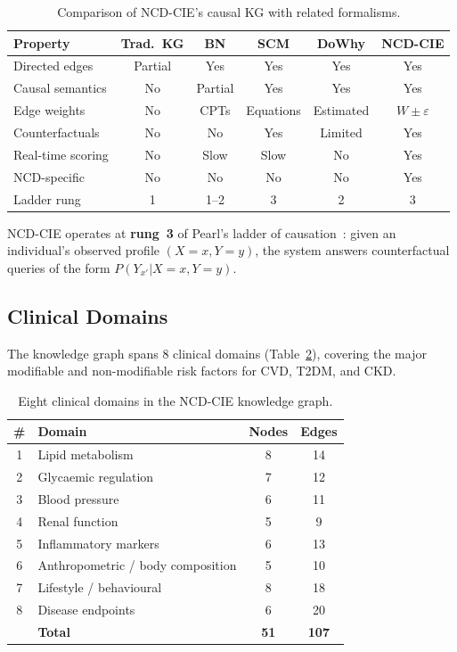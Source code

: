\documentclass[runningheads]{llncs}
\begin{document}
\begin{table}[t]
\centering
\caption{Comparison of NCD-CIE's causal KG with related formalisms.}
\label{tab:comparison}
\small
\begin{tabular}{@{}lccccc@{}}
\toprule
\textbf{Property} & \textbf{Trad.\ KG} & \textbf{BN} & \textbf{SCM} & \textbf{DoWhy} & \textbf{NCD-CIE} \\
\midrule
Directed edges       & Partial & Yes & Yes & Yes & Yes \\
Causal semantics     & No      & Partial & Yes & Yes & Yes \\
Edge weights         & No      & CPTs & Equations & Estimated & $W \pm \varepsilon$ \\
Counterfactuals      & No      & No  & Yes & Limited & Yes \\
Real-time scoring    & No      & Slow & Slow & No & Yes \\
NCD-specific         & No      & No  & No  & No & Yes \\
Ladder rung          & 1       & 1--2 & 3   & 2  & 3 \\
\bottomrule
\end{tabular}
\end{table}

NCD-CIE operates at \textbf{rung~3} of Pearl's ladder of
causation~\cite{pearl2018book}: given an individual's observed profile
$(X=x, Y=y)$, the system answers counterfactual queries of the form
$P(Y_{x'}|X=x, Y=y)$.

\subsection{Clinical Domains}

The knowledge graph spans 8 clinical domains (Table~\ref{tab:domains}),
covering the major modifiable and non-modifiable risk factors for CVD,
T2DM, and CKD.

\begin{table}[t]
\centering
\caption{Eight clinical domains in the NCD-CIE knowledge graph.}
\label{tab:domains}
\small
\begin{tabular}{@{}clcc@{}}
\toprule
\textbf{\#} & \textbf{Domain} & \textbf{Nodes} & \textbf{Edges} \\
\midrule
1 & Lipid metabolism        & 8  & 14 \\
2 & Glycaemic regulation    & 7  & 12 \\
3 & Blood pressure          & 6  & 11 \\
4 & Renal function          & 5  & 9  \\
5 & Inflammatory markers    & 6  & 13 \\
6 & Anthropometric / body composition & 5 & 10 \\
7 & Lifestyle / behavioural & 8  & 18 \\
8 & Disease endpoints       & 6  & 20 \\
\midrule
  & \textbf{Total}          & \textbf{51} & \textbf{107} \\
\bottomrule
\end{tabular}
\end{table}
\end{document}
